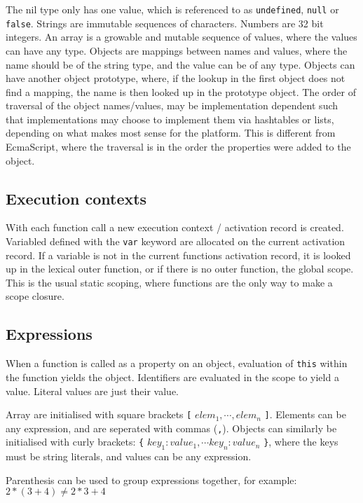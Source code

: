 \documentclass[11pt]{report}
\begin{document}
The nil type only has one value, which is referenced to as \verb|undefined|, \verb|null| or \verb|false|. 
Strings are immutable sequences of characters.
Numbers are 32 bit integers.
An array is a growable and mutable sequence of values, where the values can have any type.
Objects are mappings between names and values, where the name should be of the string type, and the value can be of any type. Objects can have another object prototype, where, if the lookup in the first object does not find a mapping, the name is then looked up in the prototype object.
The order of traversal of the object names/values, may be implementation dependent such that implementations may choose to implement them via hashtables or lists, depending on what makes most sense for the platform. This is different from EcmaScript, where the traversal is in the order the properties were added to the object.

\subsection{Execution contexts}

With each function call a new execution context / activation record is created. 
Variabled defined with the \verb|var| keyword are allocated on the current activation record. 
If a variable is not in the current functions activation record,
it is looked up in the lexical outer function, or if there is no outer function, the global scope.
This is the usual static scoping, where functions are the only way to make a scope closure.

\subsection{Expressions}

When a function is called as a property on an object, evaluation of \verb|this| within the function yields the object.  Identifiers are evaluated in the scope to yield a value. Literal values are just their value.

Array are initialised with square brackets \verb|[| $elem_1,\cdots,elem_n$ \verb|]|. Elements can be any expression, and are seperated with commas (\verb|,|). 
Objects can similarly be initialised with curly brackets: \verb|{| 
$key_1: value_1, \cdots key_n: value_n$ \verb|}|, where the keys must be string literals, and values can be any expression.

Parenthesis can be used to group expressions together, for example: $2 * (3 + 4) \neq 2 * 3 + 4$
\end{document}
